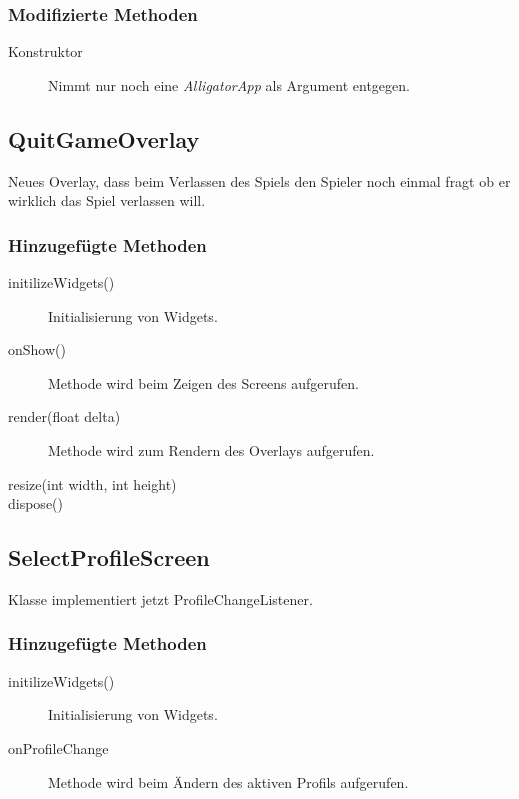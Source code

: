 \subsubsection{Modifizierte Methoden}
\begin{description}
\item[Konstruktor]
Nimmt nur noch eine \emph{AlligatorApp} als Argument entgegen.

\end{description}




\subsection{QuitGameOverlay}
Neues Overlay, dass beim Verlassen des Spiels den Spieler noch einmal fragt ob er wirklich das Spiel verlassen will.

\subsubsection{Hinzugefügte Methoden}
\begin{description}
\item[initilizeWidgets()]
Initialisierung von Widgets.
\item[onShow()]
Methode wird beim Zeigen des Screens aufgerufen.
\item[render(float delta)]
Methode wird zum Rendern des Overlays aufgerufen.
\item[resize(int width, int height)]
\item[dispose()]
\end{description}


\subsection{SelectProfileScreen}
Klasse implementiert jetzt ProfileChangeListener.
\subsubsection{Hinzugefügte Methoden}
\begin{description}
\item[initilizeWidgets()]
Initialisierung von Widgets.
\item[onProfileChange]
Methode wird beim Ändern des aktiven Profils aufgerufen.

\end{description}

